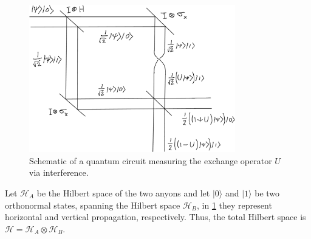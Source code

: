 \begin{figure}
  \centering
  \includegraphics[width=0.8\textwidth]{img/exchange-interference-cropped.png}
  \caption{Schematic of a quantum circuit measuring the exchange operator $U$ via interference.}
  \label{fig:exchange interference}
\end{figure}

Let $\mathcal{H}_A$ be the Hilbert space of the two anyons and let $|0⟩$ and $|1⟩$ be two orthonormal states, spanning the Hilbert space $\mathcal{H}_B$, in \cref{fig:exchange interference} they represent horizontal and vertical propagation, respectively. Thus, the total Hilbert space is $\mathcal{H} = \mathcal{H}_A⊗\mathcal{H}_B$.

